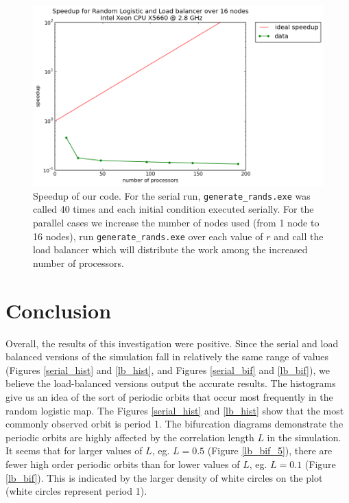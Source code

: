 \documentclass[12pt]{article}
\begin{document}
\begin{figure}[H]
	\begin{center}
		\includegraphics[scale=0.5]{speedup_random_logistic}
\caption{Speedup of our code. For the serial run,
  \texttt{generate\_rands.exe} was called 40 times and each initial
  condition executed serially. For the parallel cases we increase the number of nodes used (from 1 node to 16 nodes), run
\texttt{generate\_rands.exe} over each value of $r$ and call the load
balancer which will distribute the work among the increased number of
processors. }\label{speedup}
	\end{center}
\end{figure}

\section{Conclusion}
Overall, the results of this investigation were positive. Since the
serial and load balanced versions of the simulation fall in relatively
the same range of values (Figures
\ref{serial_hist} and \ref{lb_hist}, and Figures \ref{serial_bif} and
\ref{lb_bif}), we believe the load-balanced versions output the
accurate results. The histograms give us an idea of the sort of
periodic orbits that occur most frequently in the random logistic
map. The Figures \ref{serial_hist} and \ref{lb_hist} show that the
most commonly observed orbit is period 1. The bifurcation diagrams
demonstrate the periodic orbits are highly affected by the correlation
length $L$ in the simulation. It seems that for larger values of $L$,
eg. $L=0.5$ (Figure \ref{lb_bif_5}), there are fewer high order
periodic orbits than for lower values of $L$, eg. $L=0.1$ (Figure \ref{lb_bif}). This is indicated by the
larger density of white circles on the plot (white circles represent
period 1).
\end{document}
